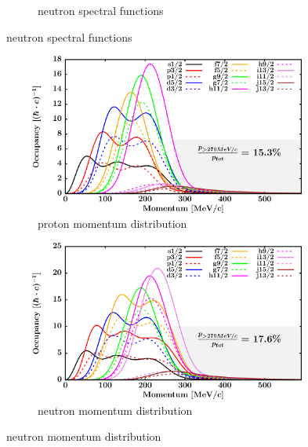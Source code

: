 \begin{figure}[hbtp]
\begin{subfigure}[b]{0.45\textwidth}
        \caption{\pbEight\ neutron spectral functions}
        \label{DOMFitData_pb208_neutron_spectralFunctions}
    \end{subfigure}
\end{figure}
\afterpage{\clearpage}
\begin{figure}[hbtp]
    \captionsetup[subfigure]{labelformat=empty}
    \centering
    \begin{subfigure}[b]{0.45\textwidth}
        \centering
        \includegraphics[width=\linewidth]{figures/pb208_protonLJMomentumDistIntegral.png}
        \caption{\pbEight\ proton momentum distribution}
        \label{DOMFitData_pb208_proton_momentumDist}
    \end{subfigure}\hspace{6pt}
    \begin{subfigure}[b]{0.45\textwidth}
        \centering
        \includegraphics[width=\linewidth]{figures/pb208_neutronLJMomentumDistIntegral.png}
        \caption{\pbEight\ neutron momentum distribution}
        \label{DOMFitData_pb208_neutron_momentumDist}
    \end{subfigure}\vspace{0.3in}

\end{figure}
